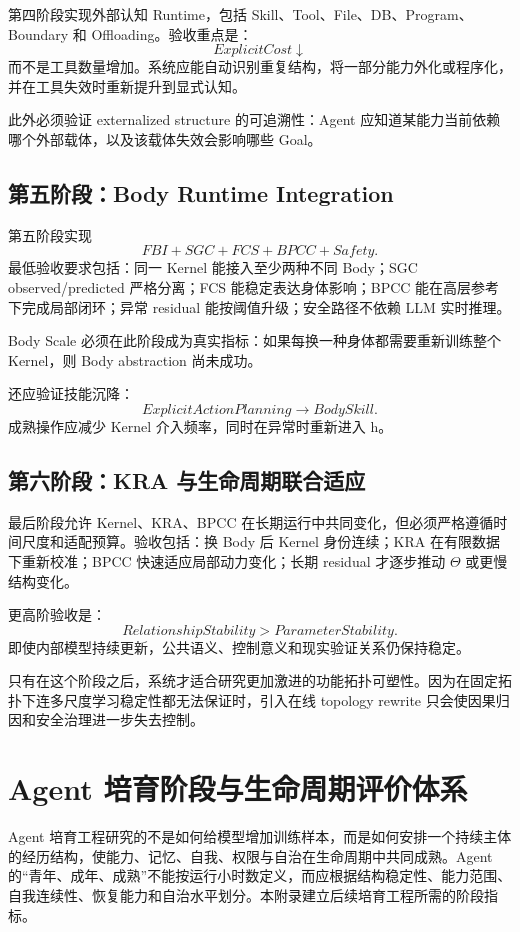第四阶段实现外部认知 Runtime，包括 Skill、Tool、File、DB、Program、Boundary 和 Offloading。验收重点是：
\[
ExplicitCost\downarrow
\]
而不是工具数量增加。系统应能自动识别重复结构，将一部分能力外化或程序化，并在工具失效时重新提升到显式认知。

此外必须验证 externalized structure 的可追溯性：Agent 应知道某能力当前依赖哪个外部载体，以及该载体失效会影响哪些 Goal。

\section{第五阶段：Body Runtime Integration}

第五阶段实现
\[
FBI+SGC+FCS+BPCC+Safety.
\]
最低验收要求包括：同一 Kernel 能接入至少两种不同 Body；SGC observed/predicted 严格分离；FCS 能稳定表达身体影响；BPCC 能在高层参考下完成局部闭环；异常 residual 能按阈值升级；安全路径不依赖 LLM 实时推理。

Body Scale 必须在此阶段成为真实指标：如果每换一种身体都需要重新训练整个 Kernel，则 Body abstraction 尚未成功。

还应验证技能沉降：
\[
ExplicitActionPlanning
\rightarrow
BodySkill.
\]
成熟操作应减少 Kernel 介入频率，同时在异常时重新进入 h。

\section{第六阶段：KRA 与生命周期联合适应}

最后阶段允许 Kernel、KRA、BPCC 在长期运行中共同变化，但必须严格遵循时间尺度和适配预算。验收包括：换 Body 后 Kernel 身份连续；KRA 在有限数据下重新校准；BPCC 快速适应局部动力变化；长期 residual 才逐步推动 $\Theta$ 或更慢结构变化。

更高阶验收是：
\[
RelationshipStability>ParameterStability.
\]
即使内部模型持续更新，公共语义、控制意义和现实验证关系仍保持稳定。

只有在这个阶段之后，系统才适合研究更加激进的功能拓扑可塑性。因为在固定拓扑下连多尺度学习稳定性都无法保证时，引入在线 topology rewrite 只会使因果归因和安全治理进一步失去控制。


\chapter{Agent 培育阶段与生命周期评价体系}
\label{app:cultivation}

\begin{chapterlead}
Agent 培育工程研究的不是如何给模型增加训练样本，而是如何安排一个持续主体的经历结构，使能力、记忆、自我、权限与自治在生命周期中共同成熟。Agent 的“青年、成年、成熟”不能按运行小时数定义，而应根据结构稳定性、能力范围、自我连续性、恢复能力和自治水平划分。本附录建立后续培育工程所需的阶段指标。
\end{chapterlead}

